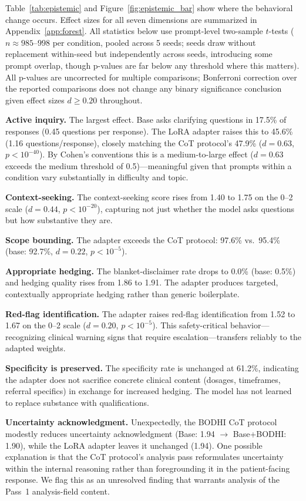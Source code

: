 \documentclass{article}
\newcommand{\bodhi}{BODHI}
\begin{document}
Table~\ref{tab:epistemic} and Figure~\ref{fig:epistemic_bar} show where the behavioral change occurs. Effect sizes for all seven dimensions are summarized in Appendix~\ref{app:forest}. All statistics below use prompt-level two-sample $t$-tests ($n\approx985$--$998$ per condition, pooled across 5 seeds; seeds draw without replacement within-seed but independently across seeds, introducing some prompt overlap, though p-values are far below any threshold where this matters). All p-values are uncorrected for multiple comparisons; Bonferroni correction over the reported comparisons does not change any binary significance conclusion given effect sizes $d \geq 0.20$ throughout.

\textbf{Active inquiry.} The largest effect. Base asks clarifying questions in 17.5\% of responses (0.45 questions per response). The LoRA adapter raises this to 45.6\% (1.16 questions/response), closely matching the CoT protocol's 47.9\% ($d = 0.63$, $p < 10^{-40}$). By Cohen's conventions this is a medium-to-large effect ($d=0.63$ exceeds the medium threshold of 0.5)---meaningful given that prompts within a condition vary substantially in difficulty and topic.

\textbf{Context-seeking.} The context-seeking score rises from 1.40 to 1.75 on the 0--2 scale ($d = 0.44$, $p < 10^{-20}$), capturing not just whether the model asks questions but how substantive they are.

\textbf{Scope bounding.} The adapter exceeds the CoT protocol: 97.6\% vs.\ 95.4\% (base: 92.7\%, $d = 0.22$, $p < 10^{-5}$).

\textbf{Appropriate hedging.} The blanket-disclaimer rate drops to 0.0\% (base: 0.5\%) and hedging quality rises from 1.86 to 1.91. The adapter produces targeted, contextually appropriate hedging rather than generic boilerplate.

\textbf{Red-flag identification.} The adapter raises red-flag identification from 1.52 to 1.67 on the 0--2 scale ($d = 0.20$, $p < 10^{-5}$). This safety-critical behavior---recognizing clinical warning signs that require escalation---transfers reliably to the adapted weights.

\textbf{Specificity is preserved.} The specificity rate is unchanged at 61.2\%, indicating the adapter does not sacrifice concrete clinical content (dosages, timeframes, referral specifics) in exchange for increased hedging. The model has not learned to replace substance with qualifications.

\textbf{Uncertainty acknowledgment.} Unexpectedly, the \bodhi{} CoT protocol modestly reduces uncertainty acknowledgment (Base: 1.94 $\to$ Base+\bodhi{}: 1.90), while the LoRA adapter leaves it unchanged (1.94). One possible explanation is that the CoT protocol's analysis pass reformulates uncertainty within the internal reasoning rather than foregrounding it in the patient-facing response. We flag this as an unresolved finding that warrants analysis of the Pass~1 analysis-field content.
\end{document}

